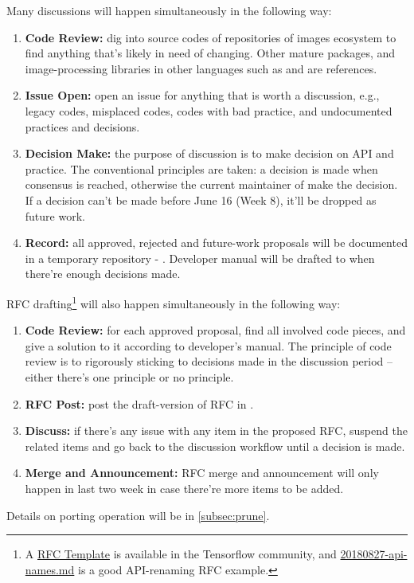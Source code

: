 Many discussions will happen simultaneously in the following way:
\begin{enumerate}
    \item \textbf{Code Review:} dig into source codes of repositories of images ecosystem to find anything that's likely in need of changing. Other mature \langjulia{} packages, and image-processing libraries in other languages such as \reposcikitimage{} and \matlabimageprocessing{} are references.
    \item \textbf{Issue Open:} open an issue for anything that is worth a discussion, e.g., legacy codes, misplaced codes, codes with bad practice, and undocumented practices and decisions.
    \item \textbf{Decision Make:} the purpose of discussion is to make decision on API and practice. The conventional principles are taken: a decision is made when consensus is reached, otherwise the current maintainer of \images{} make the decision. If a decision can't be made before June 16 (Week 8), it'll be dropped as future work.
    \item \textbf{Record:} all approved, rejected and future-work proposals will be documented in a temporary repository - \repogsoctempdoc{}. Developer manual will be drafted to \repoimagesgithubio{} when there're enough decisions made.
\end{enumerate}

RFC drafting\footnote{A \href{https://github.com/tensorflow/community/blob/master/rfcs/yyyymmdd-rfc-template.md}{RFC Template} is available in the Tensorflow community, and \href{https://github.com/tensorflow/community/blob/master/rfcs/20180827-api-names.md}{20180827-api-names.md} is a good API-renaming RFC example.} will also happen simultaneously in the following way:
\begin{enumerate}
    \item \textbf{Code Review:} for each approved proposal, find all involved code pieces, and give a solution to it according to developer's manual. The principle of code review is to rigorously sticking to decisions made in the discussion period -- either there's one principle or no principle.
    \item \textbf{RFC Post:} post the draft-version of RFC in \repogsoctempdoc{}.
    \item \textbf{Discuss:} if there's any issue with any item in the proposed RFC, suspend the related items and go back to the discussion workflow until a decision is made.
    \item \textbf{Merge and Announcement:} RFC merge and announcement will only happen in last two week in case there're more items to be added.
\end{enumerate}
Details on porting operation will be in \cref{subsec:prune}.

